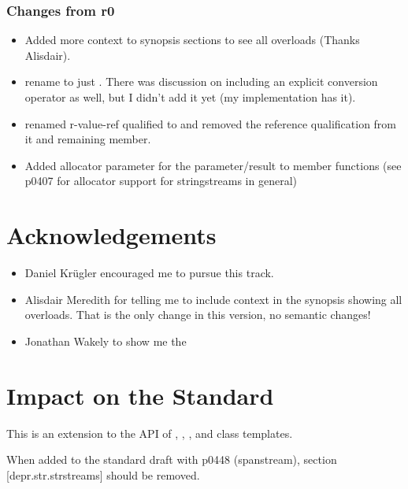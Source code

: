 \documentclass[ebook,11pt,article]{memoir}
\begin{document}
\subsection{Changes from r0}
\begin{itemize}
\item Added more context to synopsis sections to see all overloads (Thanks Alisdair).
\item rename  to just . There was discussion on including an explicit conversion operator as well, but I didn't add it yet (my implementation has it).
\item renamed r-value-ref qualified  to  and removed the reference qualification from it and remaining  member.
\item Added allocator parameter for the  parameter/result to member functions (see p0407 for allocator support for stringstreams in general)
\end{itemize}


\chapter{Acknowledgements}
\begin{itemize}
\item Daniel Kr\"ugler encouraged me to pursue this track.
\item Alisdair Meredith for telling me to include context in the synopsis showing all overloads. That is the only change in this version, no semantic changes!
\item Jonathan Wakely to show me the 
\end{itemize}




\chapter{Impact on the Standard}
This is an extension to the API of , , , and  class templates.

When added to the standard draft with p0448 (spanstream), section [depr.str.strstreams] should be removed.
\end{document}
